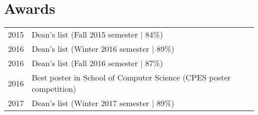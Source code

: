 \documentclass[letterpaper]{deedy-resume} %
\begin{document}
\begin{minipage}[t]{0.66\textwidth}

\section{Awards} 

\begin{tabular}{rll}
2015	 & Dean's list (Fall 2015 semester | 84\%)\\
2016	 & Dean's list (Winter 2016 semester | 89\%)\\
2016	 & Dean's list (Fall 2016 semester | 87\%)\\
2016 & Best poster in School of Computer Science (CPES poster competition)\\
2017 & Dean's list (Winter 2017 semester | 89\%)\\

\end{tabular}





\end{minipage} %








\end{document}

